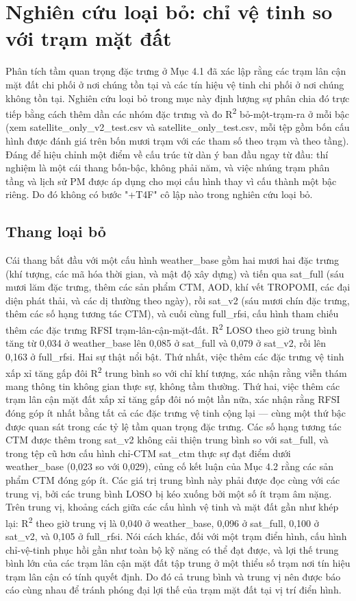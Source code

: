 \section{Nghiên cứu loại bỏ: chỉ vệ tinh so với trạm mặt đất}
Phân tích tầm quan trọng đặc trưng ở Mục 4.1 đã xác lập rằng các trạm lân cận mặt đất chi phối ở nơi chúng tồn tại và các tín hiệu vệ tinh chi phối ở nơi chúng không tồn tại. Nghiên cứu loại bỏ trong mục này định lượng sự phân chia đó trực tiếp bằng cách thêm dần các nhóm đặc trưng và đo R\textsuperscript{2} bỏ-một-trạm-ra ở mỗi bậc (xem satellite\_only\_v2\_test.csv và satellite\_only\_test.csv, mỗi tệp gồm bốn cấu hình được đánh giá trên bốn mươi trạm với các tham số theo trạm và theo tầng). Đáng để hiệu chỉnh một điểm về cấu trúc từ dàn ý ban đầu ngay từ đầu: thí nghiệm là một cái thang bốn-bậc, không phải năm, và việc nhúng trạm phân tầng và lịch sử PM được áp dụng cho mọi cấu hình thay vì cấu thành một bậc riêng. Do đó không có bước "+T4F" cô lập nào trong nghiên cứu loại bỏ.
\subsection{Thang loại bỏ}
Cái thang bắt đầu với một cấu hình weather\_base gồm hai mươi hai đặc trưng (khí tượng, các mã hóa thời gian, và mật độ xây dựng) và tiến qua sat\_full (sáu mươi lăm đặc trưng, thêm các sản phẩm CTM, AOD, khí vết TROPOMI, các đại diện phát thải, và các dị thường theo ngày), rồi sat\_v2 (sáu mươi chín đặc trưng, thêm các số hạng tương tác CTM), và cuối cùng full\_rfsi, cấu hình tham chiếu thêm các đặc trưng RFSI trạm-lân-cận-mặt-đất. R\textsuperscript{2} LOSO theo giờ trung bình tăng từ 0,034 ở weather\_base lên 0,085 ở sat\_full và 0,079 ở sat\_v2, rồi lên 0,163 ở full\_rfsi. Hai sự thật nổi bật. Thứ nhất, việc thêm các đặc trưng vệ tinh xấp xỉ tăng gấp đôi R\textsuperscript{2} trung bình so với chỉ khí tượng, xác nhận rằng viễn thám mang thông tin không gian thực sự, không tầm thường. Thứ hai, việc thêm các trạm lân cận mặt đất xấp xỉ tăng gấp đôi nó một lần nữa, xác nhận rằng RFSI đóng góp ít nhất bằng tất cả các đặc trưng vệ tinh cộng lại --- cùng một thứ bậc được quan sát trong các tỷ lệ tầm quan trọng đặc trưng. Các số hạng tương tác CTM được thêm trong sat\_v2 không cải thiện trung bình so với sat\_full, và trong tệp cũ hơn cấu hình chỉ-CTM sat\_ctm thực sự đạt điểm dưới weather\_base (0,023 so với 0,029), củng cố kết luận của Mục 4.2 rằng các sản phẩm CTM đóng góp ít.
Các giá trị trung bình này phải được đọc cùng với các trung vị, bởi các trung bình LOSO bị kéo xuống bởi một số ít trạm âm nặng. Trên trung vị, khoảng cách giữa các cấu hình vệ tinh và mặt đất gần như khép lại: R\textsuperscript{2} theo giờ trung vị là 0,040 ở weather\_base, 0,096 ở sat\_full, 0,100 ở sat\_v2, và 0,105 ở full\_rfsi. Nói cách khác, đối với một trạm điển hình, cấu hình chỉ-vệ-tinh phục hồi gần như toàn bộ kỹ năng có thể đạt được, và lợi thế trung bình lớn của các trạm lân cận mặt đất tập trung ở một thiểu số trạm nơi tín hiệu trạm lân cận có tính quyết định. Do đó cả trung bình và trung vị nên được báo cáo cùng nhau để tránh phóng đại lợi thế của trạm mặt đất tại vị trí điển hình.
